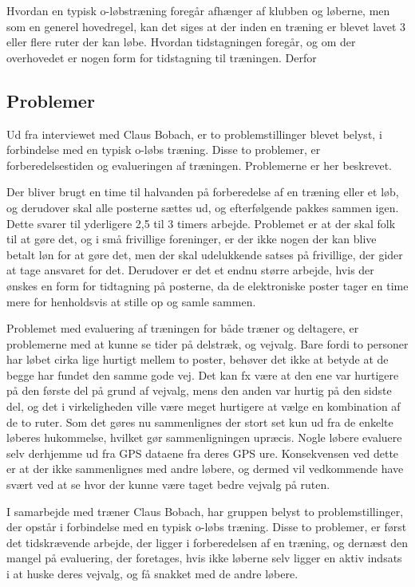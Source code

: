 Hvordan en typisk o-løbstræning foregår afhænger af klubben og løberne, men som en generel hovedregel, kan det siges at der inden en træning er blevet lavet 3 eller flere ruter der kan løbe. Hvordan tidstagningen foregår, og om der overhovedet er nogen form for tidstagning til træningen. Derfor 

\subsection{Problemer}
Ud fra interviewet med Claus Bobach, er to problemstillinger blevet belyst, i forbindelse med en typisk o-løbs træning. Disse to problemer, er forberedelsestiden og evalueringen af træningen. Problemerne er her beskrevet.

Der bliver brugt en time til halvanden på forberedelse af en træning eller et løb, og derudover skal alle posterne sættes ud, og efterfølgende pakkes sammen igen. Dette svarer til yderligere 2,5 til 3 timers arbejde. \newline
Problemet er at der skal folk til at gøre det, og i små frivillige foreninger, er der ikke nogen der kan blive betalt løn for at gøre det, men der skal udelukkende satses på frivillige, der gider at tage ansvaret for det. \newline
Derudover er det et endnu større arbejde, hvis der ønskes en form for tidtagning på posterne, da de elektroniske poster tager en time mere for henholdsvis at stille op og samle sammen. 

Problemet med evaluering af træningen for både træner og deltagere, er problemerne med at kunne se tider på delstræk, og vejvalg. Bare fordi to personer har løbet cirka lige hurtigt mellem to poster, behøver det ikke at betyde at de begge har fundet den samme gode vej. Det kan fx være at den ene var hurtigere på den første del på grund af vejvalg, mens den anden var hurtig på den sidste del, og det i virkeligheden ville være meget hurtigere at vælge en kombination af de to ruter. Som det gøres nu sammenlignes der stort set kun ud fra de enkelte løberes hukommelse, hvilket gør sammenligningen upræcis. Nogle løbere evaluere selv derhjemme ud fra GPS dataene fra deres GPS ure. Konsekvensen ved dette er at der ikke sammenlignes med andre løbere, og dermed vil vedkommende have svært ved at se hvor der kunne være taget bedre vejvalg på ruten.

I samarbejde med træner Claus Bobach, har gruppen belyst to problemstillinger, der opstår i forbindelse med en typisk o-løbs træning. Disse to problemer, er først det tidskrævende arbejde, der ligger i forberedelsen af en træning, og dernæst den mangel på evaluering, der foretages, hvis ikke løberne selv ligger en aktiv indsats i at huske deres vejvalg, og få snakket med de andre løbere. 